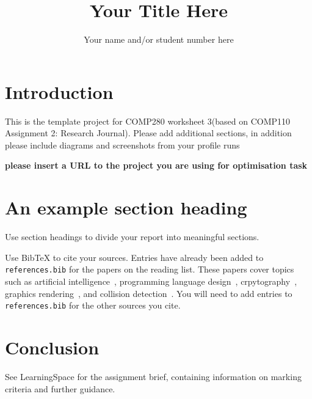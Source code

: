 \documentclass{article}
\title{Your Title Here}
\author{Your name and/or student number here}
\begin{document}
\maketitle

\section{Introduction}

This is the template project for COMP280 worksheet 3(based on COMP110 Assignment 2: Research Journal). Please add additional sections, in addition please include diagrams and screenshots from your profile runs

\textbf{please insert a URL to the project you are using for optimisation task}

\section{An example section heading}

Use section headings to divide your report into meaningful sections.

Use BibTeX to cite your sources. Entries have already been added to \texttt{references.bib} for the papers on the reading list.
These papers cover topics such as artificial intelligence~\cite{turing1950_intelligence, knuth1975_alphabeta}, programming language design~\cite{dijkstra1968_goto}, crpytography~\cite{rivest1978_rsa}, graphics rendering~\cite{phong1975_illumination}, and collision detection~\cite{gilbert1988_gjk}.
You will need to add entries to \texttt{references.bib} for the other sources you cite.

\section{Conclusion}

See LearningSpace for the assignment brief, containing information on marking criteria and further guidance.



\end{document}
